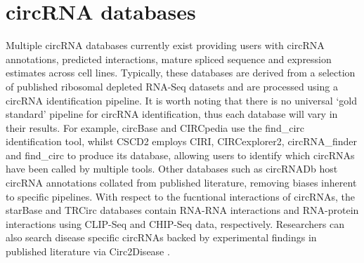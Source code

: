 \documentclass[journal,review,submit,pdftex,moreauthors]{Definitions/mdpi}
\begin{document}
\section{circRNA databases}
Multiple circRNA databases currently exist providing users with circRNA annotations, predicted interactions, mature spliced sequence and expression estimates across cell lines. Typically, these databases are derived from a selection of published ribosomal depleted RNA-Seq datasets \cite{find_circ,Salzman2012,Jeck2012Dec,Salzman2014Jun,Ivanov2015Jan,Rybak-Wolf2015Jun,Ashwal-Fluss2014Oct,Maass2017Nov} and are processed using a circRNA identification pipeline. It is worth noting that there is no universal `gold standard' pipeline for circRNA identification, thus each database will vary in their results. For example, circBase \cite{circbase} and CIRCpedia \cite{circpedia} use the find\_circ identification tool, whilst CSCD2 \cite{CSCD2} employs CIRI, CIRCexplorer2, circRNA\_finder and find\_circ to produce its database, allowing users to identify which circRNAs have been called by multiple tools. Other databases such as circRNADb \cite{circrnadb} host circRNA annotations collated from published literature, removing biases inherent to specific pipelines. With respect to the fucntional interactions of circRNAs, the starBase \cite{starbase} and TRCirc \cite{TRCirc} databases contain RNA-RNA interactions and RNA-protein interactions using CLIP-Seq and CHIP-Seq data, respectively. Researchers can also search disease specific circRNAs backed by experimental findings in published literature via Circ2Disease \cite{circ2disease}. \par
\end{document}
